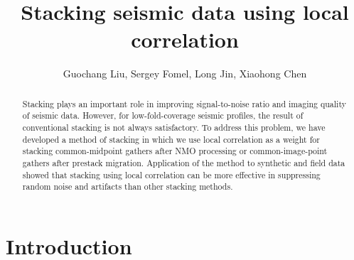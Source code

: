 \title{Stacking seismic data using local correlation}

\renewcommand{\thefootnote}{\fnsymbol{footnote}}


\address{
\footnotemark[1] State Key Laboratory of Petroleum Resources and Prospecting\\
China University of Petroleum\\
Beijing, China \\
\footnotemark[2] Bureau of Economic Geology,\\
John A. and Katherine G. Jackson School of Geosciences \\
The University of Texas at Austin \\
University Station, Box X \\
Austin, TX, USA, 78713-8924 \\
\footnotemark[3] Institute for Geophysics,\\
John A. and Katherine G. Jackson School of Geosciences \\
The University of Texas at Austin \\
Austin, TX, USA, 78713-8924
}

\author{Guochang Liu\footnotemark[1]\footnotemark[2], Sergey Fomel\footnotemark[2], Long Jin\footnotemark[3], Xiaohong Chen\footnotemark[1]}

\maketitle

\begin{abstract}

Stacking plays an important role in improving signal-to-noise ratio and imaging 
quality of seismic data. However, for low-fold-coverage seismic profiles, the 
result of conventional stacking is not always satisfactory. To address this 
problem, we have developed a method of stacking in which we use local 
correlation as a weight for stacking common-midpoint gathers after NMO 
processing or common-image-point gathers after prestack migration. Application 
of the method to synthetic and field data showed that stacking using local
correlation can be more effective in suppressing random noise and artifacts 
than other stacking methods.

\end{abstract}

\section{Introduction}

